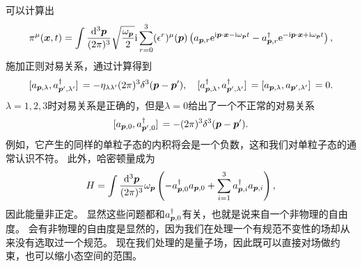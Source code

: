 \documentclass[hyperref, UTF8, a4paper]{ctexart}
\newcommand*{\ii}{\mathrm{i}}
\newcommand*{\ee}{\mathrm{e}}
\begin{document}
可以计算出
\begin{equation}
    \pi^\mu (\vb*{x}, t) = \int \frac{\dd[3]{\vb*{p}}}{(2\pi)^3} \sqrt{\frac{\omega_{\vb*{p}}}{2}} \ii \sum_{r=0}^3 (\epsilon^r)^\mu (\vb*{p}) \left( {a}_{\vb*{p}, r} \ee^{\ii \vb*{p} \cdot \vb*{x} - \ii \omega_{\vb*{p}} t} - {a}_{\vb*{p}, r}^\dagger \ee^{ - \ii \vb*{p} \cdot \vb*{x} + \ii \omega_{\vb*{p}} t} \right),
\end{equation}
施加正则对易关系，通过计算得到
\begin{equation}
    \comm*{{a}_{\vb*{p}, \lambda}}{{a}^\dagger_{\vb*{p}', \lambda'}} = - \eta_{\lambda \lambda'} (2\pi)^3 \delta^3(\vb*{p} - \vb*{p}'), \quad \comm*{{a}^\dagger_{\vb*{p}, \lambda}}{{a}^\dagger_{\vb*{p}', \lambda'}} = \comm*{{a}_{\vb*{p}, \lambda}}{{a}_{\vb*{p}', \lambda'}} = 0.
\end{equation}
$\lambda=1, 2, 3$时对易关系是正确的，但是$\lambda=0$给出了一个不正常的对易关系
\[
    \comm*{{a}_{\vb*{p}, 0}}{{a}^\dagger_{\vb*{p}', 0}} = - (2\pi)^3 \delta^3 (\vb*{p} - \vb*{p}').
\]
例如，它产生的同样的单粒子态的内积将会是一个负数，这和我们对单粒子态的通常认识不符。
此外，哈密顿量成为
\begin{equation}
    {H} = \int \frac{\dd[3]{\vb*{p}}}{(2\pi)^3} \omega_{\vb*{p}} \left( - {a}_{\vb*{p},0}^\dagger {a}_{\vb*{p}, 0} + \sum_{i=1}^3 {a}_{\vb*{p},i}^\dagger {a}_{\vb*{p}, i} \right),
\end{equation}
因此能量非正定。
显然这些问题都和${a}^\dagger_{\vb*{p},0}$有关，也就是说来自一个非物理的自由度。
会有非物理的自由度是显然的，因为我们在处理一个有规范不变性的场却从来没有选取过一个规范。
现在我们处理的是量子场，因此既可以直接对场做约束，也可以缩小态空间的范围。
\end{document}
